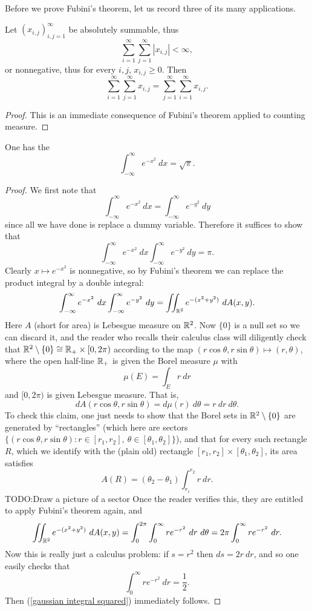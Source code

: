 Before we prove Fubini's theorem, let us record three of its many applications.
\begin{corollary}
Let ${(x_{i,j})}_{i,j=1}^{\infty}$ be absolutely summable, thus
\[\sum_{i=1}^{\infty} \sum_{j=1}^{\infty} |x_{i,j}| < \infty,\]
or nonnegative, thus for every $i,j$, $x_{i,j} \geq 0$. Then
\[\sum_{i=1}^{\infty} \sum_{j=1}^{\infty} x_{i,j} = \sum_{j=1}^{\infty} \sum_{i=1}^{\infty} x_{i,j}.\]
\end{corollary}
\begin{proof}
This is an immediate consequence of Fubini's theorem applied to counting measure.
\end{proof}

\begin{corollary}\label{Gaussian integral formula}
One has the 
\[\int_{-\infty}^{\infty} e^{-x^{2}} ~dx = \sqrt \pi.\]
\end{corollary}
\begin{proof}
We first note that
\[\int_{-\infty}^{\infty} e^{-x^{2}}~dx = \int_{-\infty}^{\infty} e^{-y^{2}}~dy\]
since all we have done is replace a dummy variable. Therefore it suffices to show that
\begin{equation}\label{gaussian integral squared}
\int_{-\infty}^{\infty} e^{-x^{2}}~dx \int_{-\infty}^{\infty} e^{-y^{2}}~dy = \pi.
\end{equation}
Clearly $x \mapsto e^{-x^{2}}$ is nonnegative, so by Fubini's theorem we can replace the product integral by a double integral:
\[\int_{-\infty}^{\infty} e^{-x^{2}}~dx \int_{-\infty}^{\infty} e^{-y^{2}}~dy = \iint_{\mathbb{R}^{2}} e^{-(x^{2} + y^{2})}~dA(x, y).\]
Here $A$ (short for area) is Lebesgue measure on $\mathbb{R}^{2}$.
Now $\{0\}$ is a null set so we can discard it, and the reader who recalls their calculus class will diligently check that $\mathbb{R}^{2} \setminus \{0\} \cong \mathbb{R}_+ \times [0, 2\pi)$ according to the map $(r \cos \theta, r \sin \theta) \mapsto (r, \theta)$, where the open half-line $\mathbb{R}_+$ is given the Borel measure $\mu$ with
\[\mu(E) = \int_{E} r~dr\]
and $[0, 2\pi)$ is given Lebesgue measure. That is,
\[dA(r \cos \theta, r \sin \theta) = d\mu(r) ~d\theta = r~dr~d\theta.\]
To check this claim, one just needs to show that the Borel sets in $\mathbb{R}^{2} \setminus \{0\}$ are generated by ``rectangles'' (which here are sectors $\{(r \cos \theta, r \sin \theta): r \in [r_{1}, r_{2}], ~\theta \in [\theta_{1}, \theta_{2}]\}$), and that for every such rectangle $R$, which we identify with the (plain old) rectangle $[r_{1}, r_{2}] \times [\theta_{1}, \theta_{2}]$, its area satisfies
\[A(R) = (\theta_{2} - \theta_{1})\int_{r_{1}}^{r_{2}} r~dr.\]
TODO:Draw a picture of a sector
Once the reader verifies this, they are entitled to apply Fubini's theorem again, and
\[\iint_{\mathbb{R}^{2}} e^{-(x^{2} + y^{2})}~dA(x, y) = \int_{0}^{2\pi} \int_{0}^{\infty} re^{-r^{2}}~dr~d\theta = 2\pi \int_{0}^{\infty} re^{-r^{2}}~dr.\]
Now this is really just a calculus problem: if $s = r^{2}$ then $ds = 2r~dr$, and so one easily checks that
\[\int_{0}^{\infty} re^{-r^{2}}~dr = \frac{1}{2}.\]
Then (\ref{gaussian integral squared}) immediately follows.
\end{proof}

